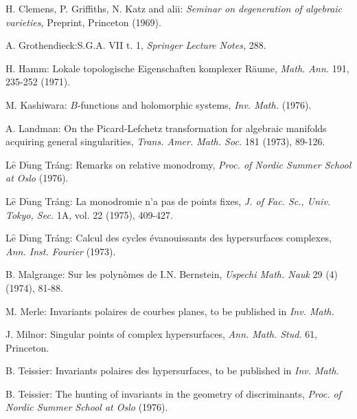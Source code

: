 \begin{thebibliography}{99}
 H. Clemens, P. Griffiths, N. Katz and alii: {\em Seminar on degeneration of algebraic varieties,} Preprint, Princeton (1969).

 A. Grothendieck:\pageoriginale S.G.A. VII t. 1, {\em Springer Lecture Notes,} 288.

 H. Hamm: Lokale topologische Eigenschaften komplexer R\"{a}ume, {\em Math. Ann.}  191, 235-252 (1971).

 M. Kashiwara: $B$-functions and holomorphic systems, {\em Inv. Math.} (1976).

 A. Landman: On the Picard-Lefchetz transformation for algebraic manifolds acquiring general singularities, {\em Trans. Amer. Math. Soc. } 181 (1973), 89-126.
 

 L$\hat{\text{e}}$ D$\tilde{\text{u}}$ng Tr\'ang: Remarks on relative monodromy, {\em Proc. of Nordic Summer School at Oslo} (1976).

 L$\hat{\text{e}}$ D$\tilde{\text{u}}$ng Tr\'ang: La monodromie n'a pas de points fixes, {\em J. of Fac. Sc., Univ. Tokyo, Sec.} 1A, vol. 22 (1975), 409-427.

 L$\hat{\text{e}}$ D$\tilde{\text{u}}$ng Tr\'ang: Calcul des cycles \'evanouissants des hypersurfaces complexes, {\em Ann. Inst. Fourier} (1973).

 B. Malgrange: Sur les polyn\`omes de I.N. Bernstein, {\em Uspechi Math. Nauk } 29 (4) (1974), 81-88.

 M. Merle: Invariants polaires de courbes planes, to be published in {\em Inv. Math.}


 J. Milnor: Singular points of complex hypersurfaces, {\em Ann. Math. Stud.} 61, Princeton. 

 B. Teissier: Invariants  polaires des hypersurfaces, to be published in {\em Inv. Math.}

 B. Teissier: The hunting of invariants in the geometry of discriminants, {\em Proc. of Nordic Summer School at Oslo } (1976).

\end{thebibliography}
